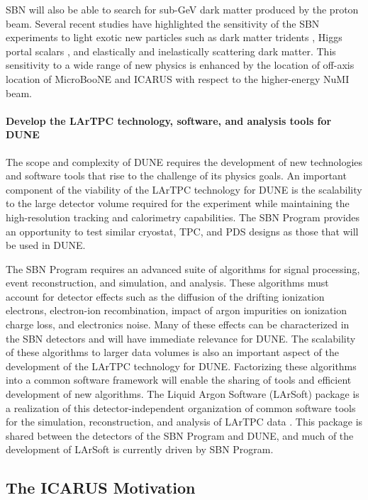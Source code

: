 SBN will also be able to search for sub-GeV dark matter produced by the proton beam. Several recent studies have highlighted the sensitivity of the SBN experiments to light exotic new particles such as dark matter tridents \cite{Gouvea2019}, Higgs portal scalars \cite{Batell2019}, and elastically \cite{Buonocore2020} and inelastically \cite{Batell2021} scattering dark matter. This sensitivity to a wide range of new physics is enhanced by the location of off-axis location of MicroBooNE and ICARUS with respect to the higher-energy NuMI beam.

\paragraph*{Develop the LArTPC technology, software, and analysis tools for DUNE}
The scope and complexity of DUNE requires the development of new technologies and software tools that rise to the challenge of its physics goals. An important component of the viability of the LArTPC technology for DUNE is the scalability to the large detector volume required for the experiment while maintaining the high-resolution tracking and calorimetry capabilities. The SBN Program provides an opportunity to test similar cryostat, TPC, and PDS designs as those that will be used in DUNE.

The SBN Program requires an advanced suite of algorithms for signal processing, event reconstruction, and simulation, and analysis. These algorithms must account for detector effects such as the diffusion of the drifting ionization electrons, electron-ion recombination, impact of argon impurities on ionization charge loss, and electronics noise. Many of these effects can be characterized in the SBN detectors and will have immediate relevance for DUNE. The scalability of these algorithms to larger data volumes is also an important aspect of the development of the LArTPC technology for DUNE. Factorizing these algorithms into a common software framework will enable the sharing of tools and efficient development of new algorithms. The Liquid Argon Software (LArSoft) package is a realization of this detector-independent organization of common software tools for the simulation, reconstruction, and analysis of LArTPC data \cite{Snider2017}. This package is shared between the detectors of the SBN Program and DUNE, and much of the development of LArSoft is currently driven by SBN Program.

\subsection{The ICARUS Motivation}

